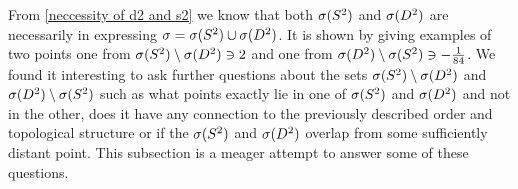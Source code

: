 From \ref{neccessity of d2 and s2} we know that both ${{\sigma}(S^2)}$ and ${{\sigma}(D^2)}$ are necessarily 
in expressing ${\sigma} = {{\sigma}(S^2)} \cup {{\sigma}(D^2)}$. It is shown by giving examples of two points 
one from ${{\sigma}(S^2)} \setminus {{\sigma}(D^2)} \ni 2$ and one from ${{\sigma}(D^2)} \setminus {{\sigma}(S^2)} \ni -\frac{1}{84}$.
We found it interesting to ask further questions about the sets  
${{\sigma}(S^2)} \setminus {{\sigma}(D^2)}$ and ${{\sigma}(D^2)} \setminus {{\sigma}(S^2)}$ such as what points 
exactly lie in one of ${{\sigma}(S^2)}$ and ${{\sigma}(D^2)}$ and not in the other, does it have 
any connection to the previously described order and topological structure 
or if the ${{\sigma}(S^2)}$ and ${{\sigma}(D^2)}$ 
overlap from some sufficiently distant point. This subsection is a meager attempt to 
answer some of these questions.



